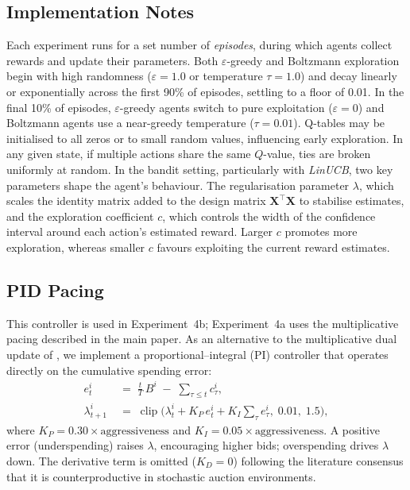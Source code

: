 \subsection{Implementation Notes}

Each experiment runs for a set number of \emph{episodes}, during which agents collect rewards and update their parameters. Both $\varepsilon$-greedy and Boltzmann exploration begin with high randomness ($\varepsilon = 1.0$ or temperature $\tau = 1.0$) and decay linearly or exponentially across the first 90\% of episodes, settling to a floor of 0.01. In the final 10\% of episodes, $\varepsilon$-greedy agents switch to pure exploitation ($\varepsilon = 0$) and Boltzmann agents use a near-greedy temperature ($\tau = 0.01$). Q-tables may be initialised to all zeros or to small random values, influencing early exploration. In any given state, if multiple actions share the same $Q$-value, ties are broken uniformly at random. In the bandit setting, particularly with \emph{LinUCB}, two key parameters shape the agent's behaviour. The regularisation parameter $\lambda$, which scales the identity matrix added to the design matrix $\mathbf{X}^\top \mathbf{X}$ to stabilise estimates, and the exploration coefficient $c$, which controls the width of the confidence interval around each action's estimated reward. Larger $c$ promotes more exploration, whereas smaller $c$ favours exploiting the current reward estimates.

\subsection{PID Pacing}

This controller is used in Experiment~4b; Experiment~4a uses the multiplicative pacing described in the main paper. As an alternative to the multiplicative dual update of \citet{Balseiro2019Learning}, we implement a proportional--integral (PI) controller that operates directly on the cumulative spending error:
\begin{align}
e_t^i &\;=\; \tfrac{t}{T}\,B^i \;-\; {\textstyle\sum_{\tau \le t}} c_\tau^i, \label{eq:pid_error}\\
\lambda_{t+1}^i &\;=\; \operatorname{clip}\!\bigl(\lambda_t^i + K_P\,e_t^i + K_I\!\textstyle\sum_{\tau} e_\tau^i,\; 0.01,\; 1.5\bigr), \label{eq:pid_update}
\end{align}
where $K_P = 0.30\times\text{aggressiveness}$ and $K_I = 0.05\times\text{aggressiveness}$. A positive error (underspending) raises $\lambda$, encouraging higher bids; overspending drives $\lambda$ down. The derivative term is omitted ($K_D = 0$) following the literature consensus that it is counterproductive in stochastic auction environments.
